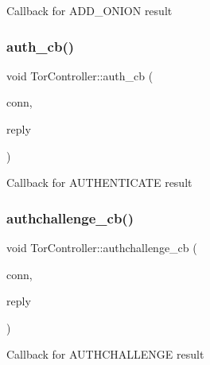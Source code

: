 Callback for A\+D\+D\+\_\+\+O\+N\+I\+ON result \mbox{\label{class_tor_controller_ae36bc33cb3088384517c68f71e9944ce}} 
\subsubsection{\texorpdfstring{auth\+\_\+cb()}{auth\_cb()}}
{\footnotesize\ttfamily void Tor\+Controller\+::auth\+\_\+cb (\begin{DoxyParamCaption}\item[{\mbox{\hyperlink{class_tor_control_connection}{Tor\+Control\+Connection}} \&}]{conn,  }\item[{const \mbox{\hyperlink{class_tor_control_reply}{Tor\+Control\+Reply}} \&}]{reply }\end{DoxyParamCaption})\hspace{0.3cm}{\ttfamily [private]}}

Callback for A\+U\+T\+H\+E\+N\+T\+I\+C\+A\+TE result \mbox{\label{class_tor_controller_a86f1396b9f242183ffe777e0951eb997}} 
\subsubsection{\texorpdfstring{authchallenge\+\_\+cb()}{authchallenge\_cb()}}
{\footnotesize\ttfamily void Tor\+Controller\+::authchallenge\+\_\+cb (\begin{DoxyParamCaption}\item[{\mbox{\hyperlink{class_tor_control_connection}{Tor\+Control\+Connection}} \&}]{conn,  }\item[{const \mbox{\hyperlink{class_tor_control_reply}{Tor\+Control\+Reply}} \&}]{reply }\end{DoxyParamCaption})\hspace{0.3cm}{\ttfamily [private]}}

Callback for A\+U\+T\+H\+C\+H\+A\+L\+L\+E\+N\+GE result \mbox{\label{class_tor_controller_a59d56a1525a08235b07dd9eadbae0d1f}} 
